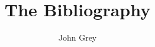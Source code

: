 \documentclass[12pt]{article}
\title{The Bibliography}
\author{John Grey}
\begin{document}
\maketitle
\nocite{*}


\end{document}
